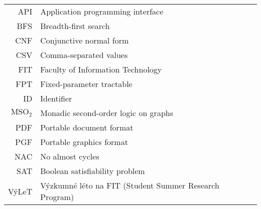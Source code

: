 \documentclass[english,bachelor,unicode,oneside,bw]{ctufit-thesis}
\begin{document}
\tableofcontents %
\listoffigures %
\begingroup
\let\clearpage\relax
\listoftables %
\thectufitlistofalgorithmscommand{}
\endgroup

\chapter*{\thectufitabbreviationlabel}

\begin{tabular}{rl}
	API                & Application programming interface                      \\
	BFS                & Breadth-first search                                   \\
	CNF                & Conjunctive normal form                                \\
	CSV                & Comma-separated values                                 \\
	FIT                & Faculty of Information Technology                      \\
	FPT                & Fixed-parameter tractable                              \\
	ID                 & Identifier                                             \\
	\( \text{MSO}_2 \) & Monadic second-order logic on graphs                   \\
	PDF                & Portable document format                               \\
	PGF                & Portable graphics format                               \\
	NAC                & No almost cycles                                       \\
	SAT                & Boolean satisfiability problem                         \\
	VýLeT              & Výzkumné léto na FIT (Student Summer Research Program) \\
\end{tabular}
\resumeTOCentries{}
\mainmatter\mainmatterinit{} %
\end{document}
